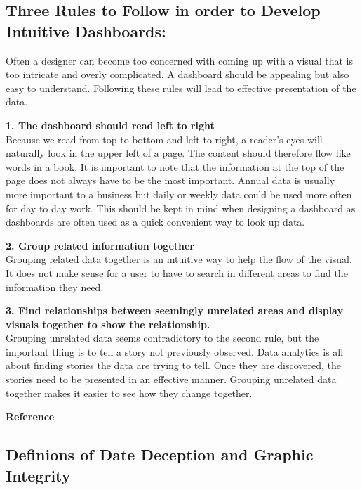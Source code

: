 \documentclass[]{book}
\theoremstyle{definition}
\theoremstyle{definition}
\theoremstyle{definition}
\theoremstyle{remark}
\begin{document}
\subsection{Three Rules to Follow in order to Develop Intuitive
Dashboards:}\label{three-rules-to-follow-in-order-to-develop-intuitive-dashboards}

Often a designer can become too concerned with coming up with a visual
that is too intricate and overly complicated. A dashboard should be
appealing but also easy to understand. Following these rules will lead
to effective presentation of the data.

\textbf{1. The dashboard should read left to right}\\
Because we read from top to bottom and left to right, a reader's eyes
will naturally look in the upper left of a page. The content should
therefore flow like words in a book. It is important to note that the
information at the top of the page does not always have to be the most
important. Annual data is usually more important to a business but daily
or weekly data could be used more often for day to day work. This should
be kept in mind when designing a dashboard as dashboards are often used
as a quick convenient way to look up data.

\textbf{2. Group related information together}\\
Grouping related data together is an intuitive way to help the flow of
the visual. It does not make sense for a user to have to search in
different areas to find the information they need.

\textbf{3. Find relationships between seemingly unrelated areas and
display visuals together to show the relationship.}\\
Grouping unrelated data seems contradictory to the second rule, but the
important thing is to tell a story not previously observed. Data
analytics is all about finding stories the data are trying to tell. Once
they are discovered, the stories need to be presented in an effective
manner. Grouping unrelated data together makes it easier to see how they
change together.

\textbf{Reference} \citep{intuitive-dash}

\subsection{Definions of Date Deception and Graphic
Integrity}\label{definions-of-date-deception-and-graphic-integrity}
\end{document}
